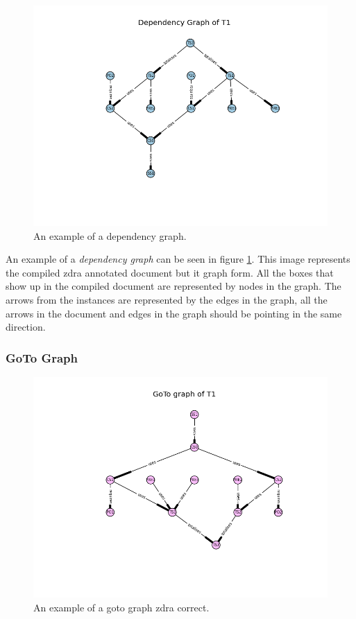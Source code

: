 \begin{figure}[H]
\centering
\includegraphics[scale=0.4]{Figures/zdra/depgraph.png}
\caption{An example of a dependency graph. \label{fig:depgraph}}
\end{figure}

An example of a \emph{dependency graph} can be seen in figure \ref{fig:depgraph}. This image represents the compiled \gls{zdra} annotated document but it graph form. All the boxes that show up in the compiled document are represented by nodes in the graph. The arrows from the instances are represented by the edges in the graph, all the arrows in the document and edges in the graph should be pointing in the same direction.


\subsubsection{GoTo Graph}

\begin{figure}[H]
\centering
\includegraphics[scale=0.4]{Figures/zdra/gotograph.png}
\caption{An example of a goto graph \gls{zdra} correct. \label{fig:gotograph}}
\end{figure}

